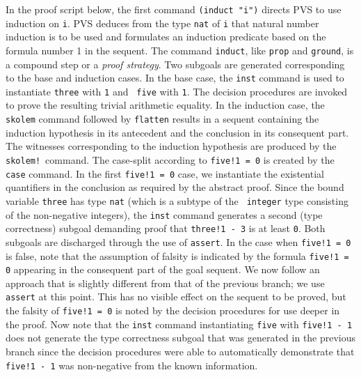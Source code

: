 In the proof script below, the first command {\tt (induct "i")} directs
PVS to use induction on {\tt i}.  PVS deduces from the type {\tt nat} of
{\tt i} that natural number induction is to be used and formulates an
induction predicate based on the formula number 1 in the sequent.  The
command {\tt induct}, like {\tt prop} and {\tt ground}, is a compound
step or a {\em proof strategy\/}.  Two subgoals are generated
corresponding to the base and induction cases.  In the base case, the
{\tt inst} command is used to instantiate {\tt three} with {\tt 1} and {\tt
five} with {\tt 1}.  The decision procedures are invoked to prove the
resulting trivial arithmetic equality.  In the induction case, the {\tt
skolem} command followed by {\tt flatten} results in a sequent
containing the induction hypothesis in its antecedent and the conclusion
in its consequent part.  The witnesses corresponding to the induction
hypothesis are produced by the {\tt skolem!}\ command.  The case-split
according to {\tt five!1 = 0} is created by the {\tt case} command.  In the
first {\tt five!1 = 0} case, we instantiate the existential quantifiers in
the conclusion as required by the abstract proof.  Since the bound
variable {\tt three} has type {\tt nat} (which is a subtype of the {\tt
integer} type consisting of the non-negative integers), the {\tt inst}
command generates a second (type correctness) subgoal demanding proof
that {\tt three!1 - 3} is at least {\tt 0}.  Both subgoals are discharged
through the use of {\tt assert}.  In the case when {\tt five!1 = 0} is
false, note that the assumption of falsity is indicated by the formula
{\tt five!1 = 0} appearing in the consequent part of the goal sequent.  We
now follow an approach that is slightly different from that of the
previous branch; we use {\tt assert} at this point.  This has no visible
effect on the sequent to be proved, but the falsity of {\tt five!1 = 0} is
noted by the decision procedures for use deeper in the proof.  Now note
that the {\tt inst} command instantiating {\tt five} with {\tt five!1 - 1}
does not generate the type correctness subgoal that was generated in the
previous branch since the decision procedures were able to automatically
demonstrate that {\tt five!1 - 1} was non-negative from the known
information. 

